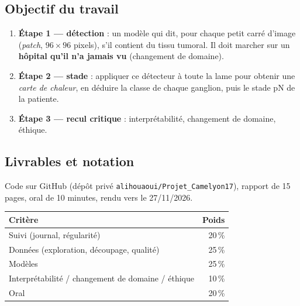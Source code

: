 \documentclass[11pt,a4paper]{article}
\begin{document}
\subsection{Objectif du travail}
\begin{enumerate}
  \item \textbf{Étape 1 — détection} : un modèle qui dit, pour chaque petit carré d'image (\emph{patch}, $96\times96$ pixels),
        s'il contient du tissu tumoral. Il doit marcher sur un \textbf{hôpital qu'il n'a jamais vu} (changement de domaine).
  \item \textbf{Étape 2 — stade} : appliquer ce détecteur à toute la lame pour obtenir une \emph{carte de chaleur},
        en déduire la classe de chaque ganglion, puis le stade pN de la patiente.
  \item \textbf{Étape 3 — recul critique} : interprétabilité, changement de domaine, éthique.
\end{enumerate}

\subsection{Livrables et notation}
Code sur GitHub (dépôt privé \texttt{alihouaoui/Projet\_Camelyon17}), rapport de 15 pages, oral de 10 minutes,
rendu vers le 27/11/2026.

\begin{table}[H]
\centering
\begin{tabular}{lr}
\toprule
\textbf{Critère} & \textbf{Poids} \\
\midrule
Suivi (journal, régularité) & 20\,\% \\
Données (exploration, découpage, qualité) & 25\,\% \\
Modèles & 25\,\% \\
Interprétabilité / changement de domaine / éthique & 10\,\% \\
Oral & 20\,\% \\
\bottomrule
\end{tabular}
\end{table}

\end{document}
